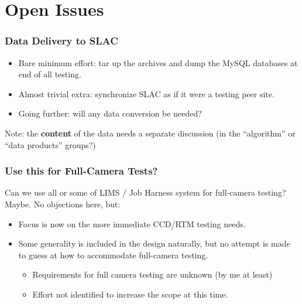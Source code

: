 \documentclass[xcolor=dvipsnames]{beamer}
\begin{document}
\section{Open Issues}

\begin{frame}
\end{frame}

\begin{frame}
  \frametitle{Data Delivery to SLAC}

  \begin{itemize}
  \item Bare minimum effort: tar up the archives and dump the MySQL
    databases at end of all testing.
  \item Almost trivial extra: synchronize SLAC as if it were a testing
    peer site.
  \item Going further: will any data conversion be needed?
  \end{itemize}

  Note: the \textbf{content} of the data needs a separate discussion
  (in the ``algorithm'' or ``data products'' groups?)

\end{frame}

\begin{frame}
  \frametitle{Use this for Full-Camera Tests?}

  Can we use all or some of LIMS / Job Harness system for full-camera
  testing?  Maybe.  No objections here, but:

  \begin{itemize}
  \item Focus is now on the more immediate CCD/RTM testing needs.
  \item Some generality is included in the design naturally, but no
    attempt is made to guess at how to accommodate full-camera testing.
    \begin{itemize}
    \item Requirements for full camera testing are unknown (by me at least)
    \item Effort not identified to increase the scope at this time.
    \end{itemize}
    
  \end{itemize}

\end{frame}
\end{document}
